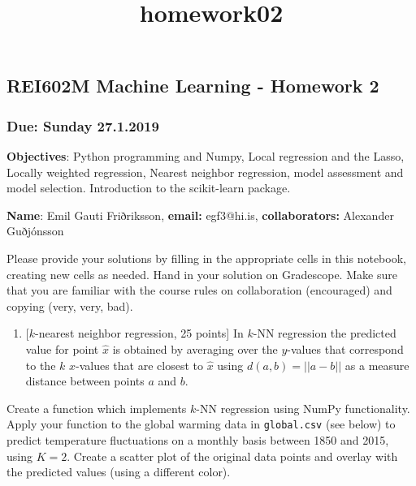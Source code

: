 \documentclass[11pt]{article}
\title{homework02}
\providecommand{\tightlist}{%
      \setlength{\itemsep}{0pt}\setlength{\parskip}{0pt}}
\begin{document}
    
    
    \maketitle
    
    

    
    \subsection{REI602M Machine Learning - Homework
2}\label{rei602m-machine-learning---homework-2}

\subsubsection{Due: Sunday 27.1.2019}\label{due-sunday-27.1.2019}

\textbf{Objectives}: Python programming and Numpy, Local regression and
the Lasso, Locally weighted regression, Nearest neighbor regression,
model assessment and model selection. Introduction to the scikit-learn
package.

\textbf{Name}: Emil Gauti Friðriksson, \textbf{email: } egf3@hi.is,
\textbf{collaborators:} Alexander Guðjónsson

Please provide your solutions by filling in the appropriate cells in
this notebook, creating new cells as needed. Hand in your solution on
Gradescope. Make sure that you are familiar with the course rules on
collaboration (encouraged) and copying (very, very, bad).

    \begin{enumerate}
\def\labelenumi{\arabic{enumi})}
\tightlist
\item
  {[}\(k\)-nearest neighbor regression, 25 points{]} In \(k\)-NN
  regression the predicted value for point \(\hat{x}\) is obtained by
  averaging over the \(y\)-values that correspond to the \(k\)
  \(x\)-values that are closest to \(\hat{x}\) using \(d(a,b)=||a-b||\)
  as a measure distance between points \(a\) and \(b\).
\end{enumerate}

Create a function which implements \(k\)-NN regression using NumPy
functionality. Apply your function to the global warming data in
\texttt{global.csv} (see below) to predict temperature fluctuations on a
monthly basis between 1850 and 2015, using \(K=2\). Create a scatter
plot of the original data points and overlay with the predicted values
(using a different color).
\end{document}

